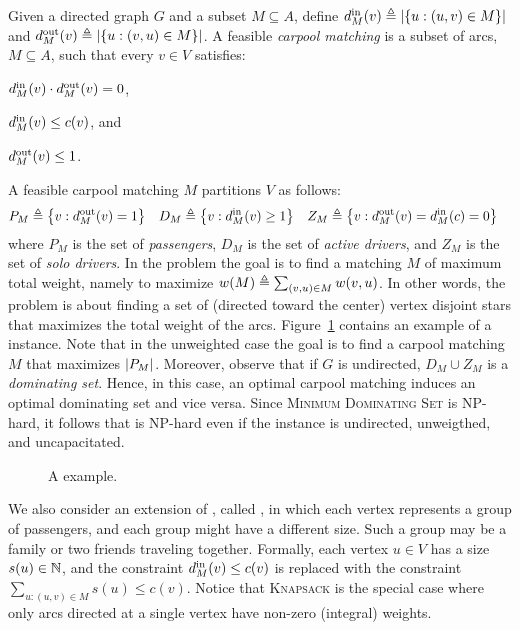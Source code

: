 Given a directed graph $G$ and a subset $M \subseteq A$, define
$\din[M](v) \eqdf \abs{\set{u :(u,v) \in M}}$ and
$\dout[M](v) \eqdf \abs{\set{u :(v,u) \in M}}$.
%
A feasible \emph{carpool matching} is a subset of arcs, $M \subseteq
A$, such that every $v \in V$ satisfies:%
\begin{inparaenum}[(i)]
\item $\din[M](v) \cdot \dout[M](v) = 0$,
\item $\din[M](v) \leq c(v)$, and 
\item $\dout[M](v) \leq 1$.
\end{inparaenum}
A feasible carpool matching $M$ partitions $V$ as follows:
\begin{align*}
P_M & \eqdf \set{v : \dout[M](v) = 1} &
D_M & \eqdf \set{v : \din[M](v) \geq 1} &
Z_M & \eqdf \set{v : \dout[M](v) = \din[M](c) = 0}
\end{align*}
where $P_M$ is the set of \emph{passengers}, $D_M$ is the set of
\emph{active drivers}, and $Z_M$ is the set of \emph{solo drivers}.
%
In the \carpool problem the goal is to find a matching $M$ of maximum
total weight, namely to maximize $w(M) \eqdf \sum_{(v,u) \in M}
w(v,u)$.  In other words, the \carpool problem is about finding a set
of (directed toward the center) vertex disjoint stars that maximizes
the total weight of the arcs.  
%
Figure~\ref{fig:carpool} contains an example of a \carpool instance.
%
Note that in the unweighted case the goal is to find a carpool
matching $M$ that maximizes $\abs{P_M}$.
%
Moreover, observe that if $G$ is undirected, $D_M \cup Z_M$ is
a \emph{dominating set}.  Hence, in this case, an optimal carpool
matching induces an optimal dominating set and vice versa.
Since \textsc{Minimum Dominating Set} is NP-hard, it follows
that \carpool is NP-hard even if the instance is undirected,
unweigthed, and uncapacitated.

\begin{figure}
\centering

\caption[]{
\label{fig:carpool}
A \carpool example.
}
\end{figure}  

%
We also consider an extension of \carpool, called \gcp,
in which each vertex represents a group of passengers, and each group
might have a different size.  Such a group may be a family or two
friends traveling together.  Formally, each vertex $u \in V$ has a
size $s(u) \in \N$, and the constraint $\din[M](v) \leq c(v)$ is
replaced with the constraint $\sum_{u:(u,v) \in M} s(u) \leq c(v)$.
%
Notice that \textsc{Knapsack} is the special case where only arcs
directed at a single vertex have non-zero (integral) weights.

